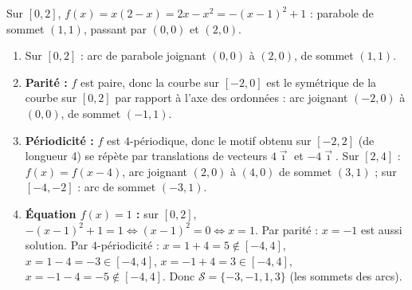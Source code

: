 \documentclass[11pt]{article}
\begin{document}
\begin{corrige}
Sur $[0,2]$, $f(x)=x(2-x)=2x-x^2=-(x-1)^2+1$ : parabole de sommet $(1,1)$, passant par $(0,0)$ et $(2,0)$.
\begin{enumerate}
    \item Sur $[0,2]$ : arc de parabole joignant $(0,0)$ à $(2,0)$, de sommet $(1,1)$.
    \item \textbf{Parité :} $f$ est paire, donc la courbe sur $[-2,0]$ est le symétrique de la courbe sur $[0,2]$ par rapport à l'axe des ordonnées : arc joignant $(-2,0)$ à $(0,0)$, de sommet $(-1,1)$.
    \item \textbf{Périodicité :} $f$ est $4$-périodique, donc le motif obtenu sur $[-2,2]$ (de longueur 4) se répète par translations de vecteurs $4\vec{\imath}$ et $-4\vec{\imath}$. Sur $[2,4]$ : $f(x)=f(x-4)$, arc joignant $(2,0)$ à $(4,0)$ de sommet $(3,1)$ ; sur $[-4,-2]$ : arc de sommet $(-3,1)$.
    \item \textbf{Équation $f(x)=1$ :} sur $[0,2]$, $-(x-1)^2+1=1 \iff (x-1)^2=0 \iff x=1$. Par parité : $x=-1$ est aussi solution. Par $4$-périodicité : $x=1+4=5 \notin [-4,4]$, $x=1-4=-3 \in [-4,4]$, $x=-1+4=3 \in [-4,4]$, $x=-1-4=-5 \notin [-4,4]$. Donc $\mathcal{S}=\{-3,-1,1,3\}$ (les sommets des arcs).
\end{enumerate}
\end{corrige}
\end{document}

